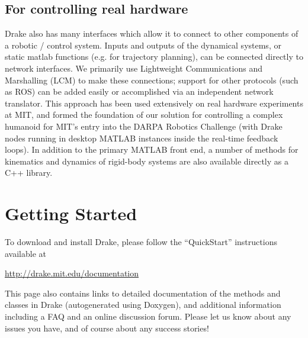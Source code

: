 
\subsection{For controlling real hardware}

Drake also has many interfaces which allow it to connect to other components of a robotic / control system.  Inputs and outputs of the dynamical systems, or static matlab functions (e.g. for trajectory planning), can be connected directly to network interfaces.  We primarily use  Lightweight Communications and Marshalling (LCM) \cite{Huang10} to make these connections; support for other protocols (such as ROS\cite{ROS}) can be added easily or accomplished via an independent network translator.  This approach has been used extensively on real hardware experiments at MIT, and formed the foundation of our solution for controlling a complex humanoid for MIT's entry into the DARPA Robotics Challenge (with Drake nodes running in desktop MATLAB instances inside the real-time feedback loops)\cite{MITDRC}.  In addition to the primary MATLAB front end, a number of methods for kinematics and dynamics of rigid-body systems are also available directly as a C++ library.  


\section{Getting Started}

To download and install Drake, please follow the ``QuickStart'' instructions available at

\medskip
\centerline{\url{http://drake.mit.edu/documentation}}
\medskip

\noindent This page also contains links to detailed documentation of the methods and classes in Drake (autogenerated using Doxygen), and additional information including a FAQ and an online discussion forum.  Please let us know about any issues you have, and of course about any success stories!

